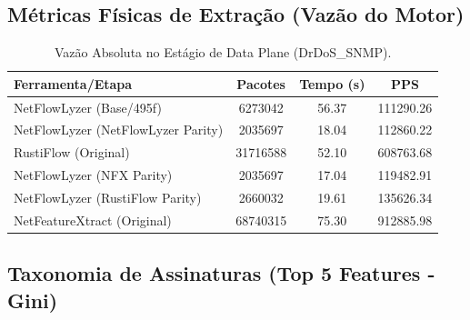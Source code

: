 \documentclass[11pt,a4paper]{article}
\begin{document}
\subsection{Métricas Físicas de Extração (Vazão do Motor)}
\begin{table}[H]
\centering
\begin{threeparttable}
\begin{tabular}{lccc}
\toprule
\textbf{Ferramenta/Etapa} & \textbf{Pacotes} & \textbf{Tempo (s)} & \textbf{PPS} \\
\midrule
NetFlowLyzer (Base/495f) & 6273042 & 56.37 & 111290.26 \\
NetFlowLyzer (NetFlowLyzer Parity) & 2035697 & 18.04 & 112860.22 \\
RustiFlow (Original) & 31716588 & 52.10 & 608763.68 \\
NetFlowLyzer (NFX Parity) & 2035697 & 17.04 & 119482.91 \\
NetFlowLyzer (RustiFlow Parity) & 2660032 & 19.61 & 135626.34 \\
NetFeatureXtract (Original) & 68740315 & 75.30 & 912885.98 \\
\bottomrule
\end{tabular}
\end{threeparttable}
\caption{Vazão Absoluta no Estágio de Data Plane (DrDoS\_SNMP).}
\end{table}

\subsection{Taxonomia de Assinaturas (Top 5 Features - Gini)}
\begin{table}[H]
\centering
{}
\caption{Principais atributos de correlação estocástica por limiar dimensional (DrDoS\_SNMP).}
\end{table}
\end{document}
